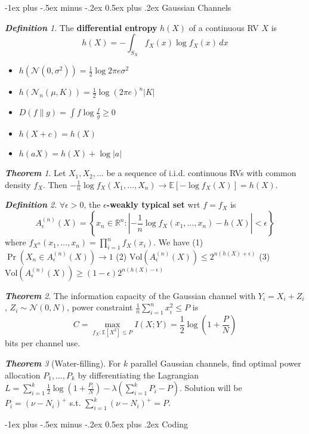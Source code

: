 \documentclass[frenchspacing,9pt,landscape,a4paper]{article}
\makeatletter
\renewcommand{\section}{\@startsection{section}{1}{0mm}%
                                {-1ex plus -.5ex minus -.2ex}%
                                {0.5ex plus .2ex}%
                                {\normalfont\large\bfseries}}
\newcommand{\BR}{\mathbb R}
\newcommand{\abs}[1]{\left\lvert #1 \right\rvert}
\DeclareMathOperator{\pr}{Pr}
\theoremstyle{remark}
\newtheorem*{thm}{\textbf{Theorem}}
\newtheorem*{defn}{\textbf{Definition}}
\makeatother
\begin{document}
\begin{multicols}{4}
\section{Gaussian Channels}
\begin{defn}
    The \textbf{differential entropy} $h(X)$ of a continuous RV  $X$ is
    \[h(X)=-\int_{S_X}f_X(x)\log f_X(x)\,dx\]
\end{defn}
\begin{itemize}
    \item $h(\mathcal{N}(0,\sigma^2))=\frac{1}{2}\log 2\pi e\sigma^2$ 
    \item $h(\mathcal{N}_n(\mu,K))=\frac{1}{2}\log(2\pi e)^n\abs{K}$ 
    \item $D(f\parallel g)=\int f\log \frac{f}{g}\geq 0$ 
    \item $h(X+c)=h(X)$
    \item  $h(aX)=h(X)+\log\abs{a}$
\end{itemize}
\begin{thm}
    Let $X_1,X_2,\dots$ be a sequence of i.i.d. continuous RVs with common density $f_X$. Then
    $-\frac{1}{n}\log f_X(X_1,\dots,X_n)\to\mathbb{E}[-\log f_X(X)]=h(X)$.
\end{thm}
\begin{defn}
    $\forall\epsilon>0$, the \textbf{$\epsilon$-weakly typical set} wrt $f=f_X$ is
    \[A_\epsilon^{(n)}(X)=\left\{x_n\in\BR^n:\abs{-\frac{1}{n}\log f_X(x_1,\dots,x_n)-h(X)}<\epsilon\right\}\] where
    $f_{X^n}(x_1,\dots,x_n)=\prod_{i=1}^n f_X(x_i)$. We have (1) $\pr(X_n\in A_\epsilon^{(n)}(X))\to 1$ (2)
    $\text{Vol}(A_\epsilon^{(n)}(X))\leq 2^{n(h(X)+\epsilon)}$ (3)
    $\text{Vol}(A_\epsilon^{(n)}(X))\geq(1-\epsilon)2^{n(h(X)-\epsilon)}$
\end{defn}
\begin{thm}
    The information capacity of the Gaussian channel with $Y_i=X_i+Z_i$,  $Z_i\sim\mathcal{N}(0,N)$, power
    constraint  $\frac{1}{n}\sum_{i=1}^n x_i^2\leq P$ is 
    \[C=\max_{f_X:\mathbb{E}[X^2]\leq P}I(X;Y)=\frac{1}{2}\log\left(1+\frac{P}{N}\right)\] bits per channel
    use.
\end{thm}
\begin{thm}[Water-filling]
For $k$ parallel Gaussian channels, find optimal power allocation  $P_1,\dots,P_k$ by differentiating the
Lagrangian $L=\sum_{i=1}^k \frac{1}{2}\log\left(1+\frac{P_i}{N}\right)-\lambda(\sum_{i=1}^k P_i-P)$.
Solution will be  $P_i=(\nu-N_i)^+$ s.t.  $\sum_{i=1}^k(\nu-N_i)^+=P$.    
\end{thm}
\section{Coding}

\end{multicols}
\end{document}
